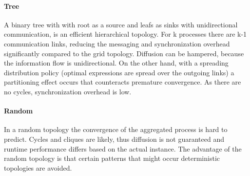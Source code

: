 \paragraph{Tree}
A binary tree with with root as a source and leafs as sinks with unidirectional communication, is an efficient hierarchical topology. For k processes there are k-1 communication links, reducing the messaging and synchronization overhead significantly compared to the grid topology. Diffusion can be hampered, because the information flow is unidirectional. On the other hand, with a spreading distribution policy (optimal expressions are spread over the outgoing links) a partitioning effect occurs that counteracts premature convergence. As there are no cycles, synchronization overhead is low.
\paragraph{Random}
In a random topology the convergence of the aggregated process is hard to predict. Cycles and cliques are likely, thus diffusion is not guaranteed and runtime performance differs based on the actual instance. The advantage of the random topology is that certain patterns that might occur deterministic topologies are avoided.